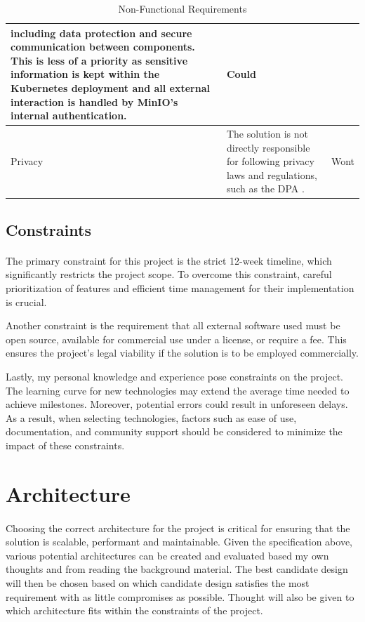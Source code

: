 \documentclass[12pt, conference, final, a4paper, onecolumn, compsoc]{IEEEtran}
\begin{document}
\begin{table}[H]
\begin{tabular}{|l|p{}|l|}
               including data protection and secure communication between
               components. This is less of a priority as sensitive information
               is kept within the Kubernetes deployment and all external
               interaction is handled by MinIO's internal authentication. & Could \\ \hline
    Privacy & The solution is not directly responsible for following privacy
              laws and regulations, such as the DPA \citep{dpa}. & Wont \\ \hline
  \end{tabular}
  \caption{Non-Functional Requirements}
  \label{tab:non_functional_requirements}
\end{table}

\subsection{Constraints}
\paragraph{}

The primary constraint for this project is the strict 12-week timeline, which
significantly restricts the project scope. To overcome this constraint, careful
prioritization of features and efficient time management for their
implementation is crucial.

Another constraint is the requirement that all external software used must be
open source, available for commercial use under a license, or require a fee.
This ensures the project's legal viability if the solution is to be employed
commercially.

Lastly, my personal knowledge and experience pose constraints on the project.
The learning curve for new technologies may extend the average time needed to
achieve milestones. Moreover, potential errors could result in unforeseen
delays. As a result, when selecting technologies, factors such as ease of use,
documentation, and community support should be considered to minimize the impact
of these constraints.

\section{Architecture}

\paragraph{}
Choosing the correct architecture for the project is critical for ensuring that
the solution is scalable, performant and maintainable. Given the specification
above, various potential architectures can be created and evaluated based my own
thoughts and from reading the background material. The best candidate design
will then be chosen based on which candidate design satisfies the most
requirement with as little compromises as possible. Thought will also be given
to which architecture fits within the constraints of the project.
\end{document}

